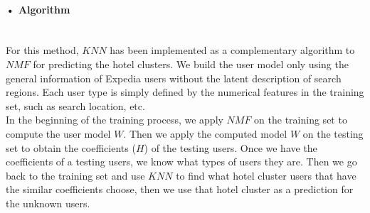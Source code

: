 \documentclass[11pt]{article} %
\begin{document}
\paragraph{• Algorithm}\mbox{}\\
For this method, $KNN$ has been implemented as a complementary algorithm to $NMF$ for predicting the hotel clusters. We build the user model only using the general information of Expedia users without the latent description of search regions. Each user type is simply defined by the numerical features in the training set, such as search location, etc.\\
In the beginning of the training process, we apply $NMF$ on the training set to compute the user model $W$. Then we apply the computed model $W$ on the testing set to obtain the coefficients ($H$) of the testing users. Once we have the coefficients of a testing users, we know what types of users they are. Then we go back to the training set and use $KNN$ to find what hotel cluster users that have the similar coefficients choose, then we use that hotel cluster as a prediction for the unknown users.
\end{document}
